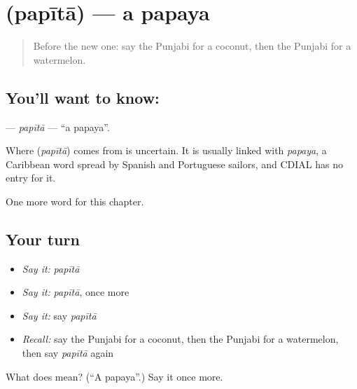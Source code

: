 \section[\texorpdfstring{\pa{ਪਪੀਤਾ} (papītā)}{ਪਪੀਤਾ (papītā)}]{ (papītā) — a papaya}

\label{lesson:PA-C123-papita}



\begin{quote}
Before the new one: say the Punjabi for a coconut, then the Punjabi for a watermelon.
\end{quote}

\subsection*{You'll want to know: }
\textbf{} — \emph{papītā} — \textquotedblleft{}a papaya\textquotedblright{}.

\begin{cousinweb}
Where \textbf{} (\emph{papītā}) comes from is uncertain. It is usually linked with \emph{papaya}, a Caribbean word spread by Spanish and Portuguese sailors, and CDIAL has no entry for it.
\end{cousinweb}

\begin{grammarlens}[title={What you've built}]
One more word for this chapter.
\end{grammarlens}

\subsection*{Your turn}
\begin{itemize}
\raggedright
  \item \emph{Say it:} \emph{papītā}
  \item \emph{Say it:} \emph{papītā}, once more
  \item \emph{Say it:} say \emph{papītā}
  \item \emph{Recall:} say the Punjabi for a coconut, then the Punjabi for a watermelon, then say \emph{papītā} again
\end{itemize}

\begin{tcolorbox}[breakable,colback=teal!4,colframe=teal!35!black,title={Before you move on}]
What does  mean? (\textquotedblleft{}A papaya\textquotedblright{}.) Say it once more.
\end{tcolorbox}
